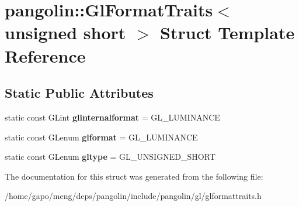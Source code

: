 \hypertarget{structpangolin_1_1_gl_format_traits_3_01unsigned_01short_01_4}{}\section{pangolin\+:\+:Gl\+Format\+Traits$<$ unsigned short $>$ Struct Template Reference}
\label{structpangolin_1_1_gl_format_traits_3_01unsigned_01short_01_4}
\subsection*{Static Public Attributes}
\begin{DoxyCompactItemize}
\item 
static const G\+Lint {\bfseries glinternalformat} = G\+L\+\_\+\+L\+U\+M\+I\+N\+A\+N\+CE\hypertarget{structpangolin_1_1_gl_format_traits_3_01unsigned_01short_01_4_a71f2c7837f163bf56a3ccbddc71e2f1d}{}\label{structpangolin_1_1_gl_format_traits_3_01unsigned_01short_01_4_a71f2c7837f163bf56a3ccbddc71e2f1d}

\item 
static const G\+Lenum {\bfseries glformat} = G\+L\+\_\+\+L\+U\+M\+I\+N\+A\+N\+CE\hypertarget{structpangolin_1_1_gl_format_traits_3_01unsigned_01short_01_4_a3fcabc39dfd25f8be1b64ca2da5075ad}{}\label{structpangolin_1_1_gl_format_traits_3_01unsigned_01short_01_4_a3fcabc39dfd25f8be1b64ca2da5075ad}

\item 
static const G\+Lenum {\bfseries gltype} = G\+L\+\_\+\+U\+N\+S\+I\+G\+N\+E\+D\+\_\+\+S\+H\+O\+RT\hypertarget{structpangolin_1_1_gl_format_traits_3_01unsigned_01short_01_4_a122e802cf03dcae2c34ef33fdf08edab}{}\label{structpangolin_1_1_gl_format_traits_3_01unsigned_01short_01_4_a122e802cf03dcae2c34ef33fdf08edab}

\end{DoxyCompactItemize}


The documentation for this struct was generated from the following file\+:\begin{DoxyCompactItemize}
\item 
/home/gapo/meng/deps/pangolin/include/pangolin/gl/glformattraits.\+h\end{DoxyCompactItemize}
